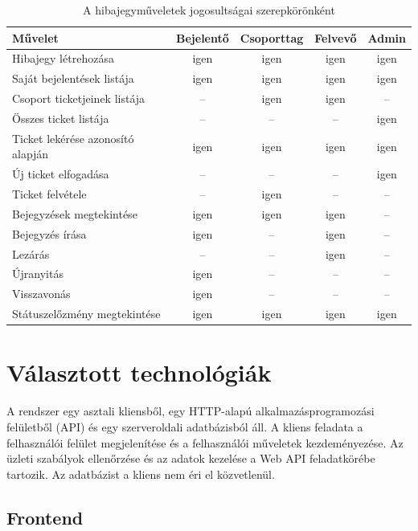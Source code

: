 \documentclass[12pt, a4paper, twoside]{article}
\begin{document}
\begin{table}[H]
    \centering
    \footnotesize
    \begin{tabular}{>{\raggedright\arraybackslash}p{5.2cm}cccc}
        \toprule
        \textbf{Művelet} & \textbf{Bejelentő} & \textbf{Csoporttag} & \textbf{Felvevő} & \textbf{Admin} \\
        \midrule
        Hibajegy létrehozása & igen & igen & igen & igen \\
        Saját bejelentések listája & igen & igen & igen & igen \\
        Csoport ticketjeinek listája & -- & igen & igen & -- \\
        Összes ticket listája & -- & -- & -- & igen \\
        Ticket lekérése azonosító alapján & igen & igen & igen & igen \\
        Új ticket elfogadása & -- & -- & -- & igen \\
        Ticket felvétele & -- & igen & -- & -- \\
        Bejegyzések megtekintése & igen & igen & igen & -- \\
        Bejegyzés írása & igen & -- & igen & -- \\
        Lezárás & -- & -- & igen & -- \\
        Újranyitás & igen & -- & -- & -- \\
        Visszavonás & igen & -- & -- & -- \\
        Státuszelőzmény megtekintése & igen & igen & igen & igen \\
        \bottomrule
    \end{tabular}
    \caption{A hibajegyműveletek jogosultságai szerepkörönként}
    \label{tab:permissions}
\end{table}

\section{Választott technológiák}

A rendszer egy asztali kliensből, egy HTTP-alapú alkalmazásprogramozási felületből (API) és egy szerveroldali adatbázisból áll. A kliens feladata a felhasználói felület megjelenítése és a felhasználói műveletek kezdeményezése. Az üzleti szabályok ellenőrzése és az adatok kezelése a Web API feladatkörébe tartozik. Az adatbázist a kliens nem éri el közvetlenül.

\subsection{Frontend}
\end{document}
